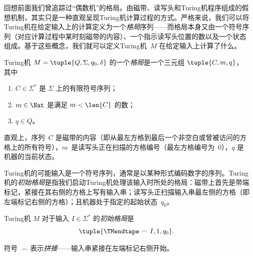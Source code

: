 \documentclass[../../../include/open-logic-section]{subfiles}
\begin{document}

\begin{explain}
回想前面我们曾追踪过“偶数机”的格局。由磁带、读写头和Turing机程序组成的假想机制，其实只是一种直观呈现Turing机计算过程的方式。严格来说，我们可以将Turing机在给定输入上的计算定义为一个\emph{格局}序列——而格局本身又由一个符号序列（对应计算过程中某时刻磁带的内容）、一个指示读写头位置的数以及一个状态组成。基于这些概念，我们就可以定义Turing机~$M$ 在给定输入上计算了什么。
\end{explain}

\begin{defn}[格局]
Turing机 $M = \tuple{Q, \Sigma, q_0,
\delta}$ 的一个\emph{格局}是一个三元组 $\tuple{C, m, q}$，其中
\begin{enumerate}
\item $C \in \Sigma^*$ 是 $\Sigma$ 上的有限符号序列；
\item $m \in \Nat$ 是满足 $m < \len{C}$ 的数；
\item $q \in Q$。
\end{enumerate}
直观上，序列~$C$ 是磁带的内容（即从最左方格到最后一个非空白或曾被访问的方格上的所有符号），$m$~是读写头正在扫描的方格编号（最左方格编号为~$0$），$q$ 是机器的当前状态。
\end{defn}

\begin{explain}
Turing机的可能输入是一个符号序列，通常是以某种形式编码数字的序列。Turing机的\emph{初始格局}是指我们启动Turing机处理该输入时所处的格局：磁带上首先是带端标记，紧接在其右侧的方格上写有输入串；读写头正扫描输入串最左侧的方格（即左端标记右侧的方格）；且机器处于指定的起始状态~$q_0$。
\end{explain}

\begin{defn}[初始格局]
Turing机 $M$ 对于输入 $I \in \Sigma^*$ 的\emph{初始格局}是
\[
\tuple{\TMendtape \frown I, 1, q_0}.
\]
\end{defn}

\begin{explain}
符号~$\frown$ 表示\emph{拼接}——输入串紧接在左端标记右侧开始。
\end{explain}
\end{document}
